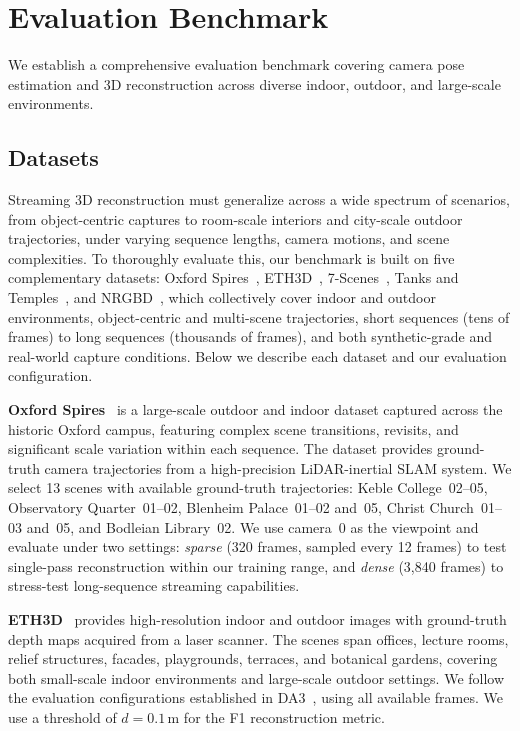 \section{Evaluation Benchmark}
\label{sec:benchmark}



We establish a comprehensive evaluation benchmark covering 
camera pose estimation and 3D reconstruction across diverse indoor, 
outdoor, and large-scale environments.

\subsection{Datasets}
\label{sec:eval_datasets}

Streaming 3D reconstruction must generalize across a wide spectrum of
scenarios, from object-centric captures to room-scale interiors and
city-scale outdoor trajectories, under varying sequence lengths,
camera motions, and scene complexities.
To thoroughly evaluate this, our benchmark is built on five
complementary datasets: Oxford Spires~\cite{tao2025spires},
ETH3D~\cite{schops2017multi}, 7-Scenes~\cite{shotton2013scene},
Tanks and Temples~\cite{Knapitsch2017}, and NRGBD~\cite{azinovic2022neural},
which collectively cover indoor and outdoor environments,
object-centric and multi-scene trajectories, short sequences
(tens of frames) to long sequences (thousands of frames), and
both synthetic-grade and real-world capture conditions.
Below we describe each dataset and our evaluation configuration.

\noindent\textbf{Oxford Spires}~\cite{tao2025spires} is a large-scale
outdoor and indoor dataset captured across the historic Oxford campus,
featuring complex scene transitions, revisits, and significant scale
variation within each sequence.
The dataset provides ground-truth camera trajectories from a
high-precision LiDAR-inertial SLAM system.
We select 13 scenes with available ground-truth trajectories: Keble
College~02--05, Observatory Quarter~01--02, Blenheim Palace~01--02
and~05, Christ Church~01--03 and~05, and Bodleian Library~02.
We use camera~0 as the viewpoint and evaluate under two settings:
\textit{sparse} (320 frames, sampled every 12 frames) to test
single-pass reconstruction within our training range, and
\textit{dense} (3{,}840 frames) to stress-test long-sequence
streaming capabilities.

\noindent\textbf{ETH3D}~\cite{schops2017multi} provides
high-resolution indoor and outdoor images with ground-truth depth maps
acquired from a laser scanner.
The scenes span offices, lecture rooms, relief structures, facades,
playgrounds, terraces, and botanical gardens, covering both small-scale
indoor environments and large-scale outdoor settings.
We follow the evaluation configurations established in
DA3~\cite{depthanything3}, using all available frames.
We use a threshold of $d = 0.1$\,m for the F1 reconstruction metric.

